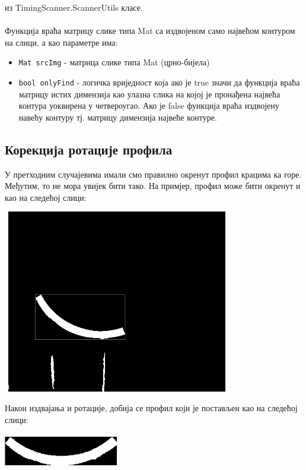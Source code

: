 \documentclass[12pt]{article}
\begin{document}
из TimingScanner.ScannerUtils класе.\\\\
Функција враћа матрицу слике типа Mat са издвојеном само највећом контуром на слици, а као параметре има:
\begin{itemize}
    \item \texttt{Mat srcImg} - матрица слике типа Mat (црно-бијела)
    \item \texttt{bool onlyFind} - логичка вриједност која ако је true значи да функција враћа матрицу истих димензија као улазна слика на којој је пронађена највећа контура уоквирена у четвероугао. Ако је false функција враћа издвојену навећу контуру тј. матрицу димензија највеће контуре.
\end{itemize}

\subsection{Корекција ротације профила}
У претходним случајевима имали смо правилно окренут профил крацима ка горе. Међутим, то не мора увијек бити тако. На примјер, профил може бити окренут и као на следећој слици:
\vspace{0.5cm}
\begin{center}
    \centering 
    \includegraphics[height=8cm, width=10cm]{images/7_section_bend.png}
\end{center}
\vspace{0.5cm}
Након издвајања и ротације, добија се профил који је постављен као на следећој слици:
\vspace{0.5cm}
\begin{center}
    \centering 
    \includegraphics[height=1.5cm, width=5cm]{images/8_correct_rotation.png}
\end{center}
\end{document}
